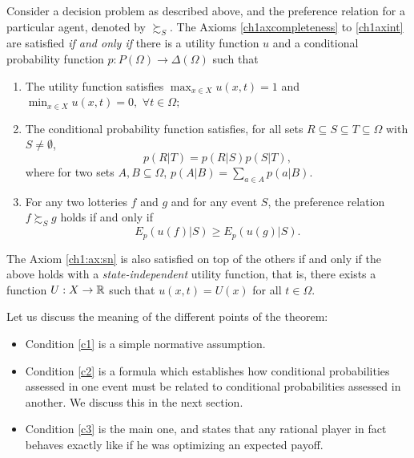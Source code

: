 \begin{theorem}
Consider a decision problem as described above, and the preference relation for a particular agent, denoted by $\succsim_S.$
The Axioms \ref{ch1axcompleteness} to \ref{ch1axint}  are satisfied \emph{if and only if} there is a utility function $u$ and a conditional probability function $p : P(\Omega) \rightarrow  \Delta(\Omega)$ such that
\begin{enumerate}
\item The utility function satisfies $\max_{x \in X} u(x,t) = 1$ and $\min_{x \in X} u(x,t) =0,$  $\forall t \in \Omega;$
\label{c1}
\item The conditional probability function satisfies, for all sets $R \subseteq S \subseteq T \subseteq \Omega$ with $S \neq \emptyset$,
\begin{equation}
p(R|T) = p(R|S)p(S|T),
\label{ch1:eq:probaas}
\end{equation}
where for two sets $A, B \subseteq \Omega$, $p(A|B) = \sum_{a \in A}p(a|B).$
\label{c2}
\item For any two lotteries $f$ and $g$ and for any event $S$, the preference relation $f \succsim_S g$ holds if and only if
$$ E_p(u(f) | S) \geq E_p(u(g) | S).$$
\label{c3}
\end{enumerate}
The Axiom \ref{ch1:ax:sn} is also satisfied on top of the others if and only if the above holds with a \emph{state-independent} utility function, that is,
there exists a function $U : X \rightarrow \mathbb{R}$ such that
$u(x,t) = U(x)$ for all $t \in \Omega$.
\label{ch1:utility-maximization}
\end{theorem}


Let us discuss the meaning of the different points of the theorem:
\begin{itemize}
\item Condition \ref{c1} is a simple normative assumption.
\item Condition \ref{c2} is a formula which establishes how conditional probabilities assessed in one event must be related to conditional probabilities assessed in another. We discuss this in the next section. %
\item Condition \ref{c3} is the main one, and states that any rational player in fact behaves exactly like if he was optimizing an expected payoff.
\end{itemize}

